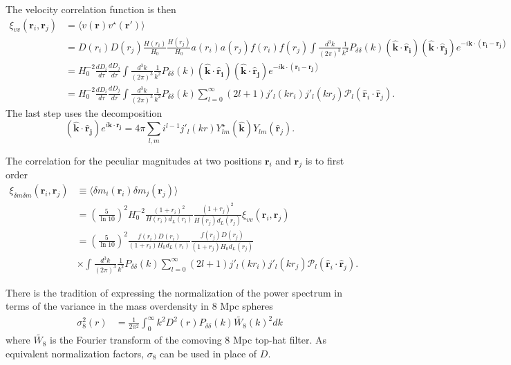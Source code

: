 \documentclass[11pt, oneside]{article}   	%
\begin{document}
The  velocity correlation function is then
\begin{align}
\xi_{v v}(\mathbf{r}_i,\mathbf{r}_j)  & =
\langle v(\mathbf{r})  v^{\star}(\mathbf{r'}) \rangle \\
& = D(r_i) D(r_j)  \frac{H(r_i)}{H_0} \frac{H(r_j)}{H_0} a(r_i) a(r_j) f(r_i) f(r_j)
\int \frac{d^3k}{(2\pi)^3}  \frac{1}{k^2} P_{\delta \delta}(k) 
(\mathbf{\hat{k}} \cdot \mathbf{\hat{r}_i})(\mathbf{\hat{k}} \cdot \mathbf{\hat{r}_j})
e^{-i \mathbf{k}\cdot (\mathbf{r_i}-\mathbf{r_j})} \\
&= H_0^{-2}\frac{dD_i}{d\tau} \frac{dD_j}{d\tau}   \int \frac{d^3k}{(2\pi)^3}  \frac{1}{k^2}  P_{\delta \delta}(k) (\mathbf{\hat{k}} \cdot \mathbf{\hat{r}_i})(\mathbf{\hat{k}} \cdot \mathbf{\hat{r}_j})  e^{-i \mathbf{k}\cdot (\mathbf{r_i}-\mathbf{r_j})}\\
&= H_0^{-2} \frac{dD_i}{d\tau} \frac{dD_j}{d\tau}   \int \frac{d^3k}{(2\pi)^3}  \frac{1}{k^2}  P_{\delta \delta}(k) \sum_{l=0}^{\infty}(2l+1) j'_l(kr_i) j'_l(kr_j)
\mathcal{P}_l(\mathbf{\hat{r}}_i \cdot \mathbf{\hat{r}}_j).
\end{align}
The last step uses the decomposition
\begin{equation}
(\mathbf{\hat{k}} \cdot \mathbf{\hat{r}_j})   e^{i \mathbf{k}\cdot \mathbf{r_j}} = 4\pi \sum_{l,m} i^{l-1}j'_l(kr) Y^{\star}_{lm}(\mathbf{\hat{k}})
Y_{lm}(\mathbf{\hat{r}}_j).
\end{equation}

The correlation for the peculiar magnitudes at two positions
$\mathbf{r}_i$ and $\mathbf{r}_j$ is to first order 
\begin{align}
\xi_{\delta m \delta m}(\mathbf{r}_i,\mathbf{r}_j)  & \equiv  \langle \delta m_i(\mathbf{r}_i) \delta m_j(\mathbf{r}_j) \rangle\\
& =  \left( \frac{5}{\ln{10}}\right)^2  H_0^{-2}\frac{(1+r_i)^2}{H(r_i)d_L(r_i)} \frac{(1+r_j)^2}{H(r_j)d_L(r_j)} \xi_{v v}(\mathbf{r}_i,\mathbf{r}_j)  \\
& =  \left( \frac{5}{\ln{10}}\right)^2 \frac{f(r_i)D(r_i)}{(1+r_i)H_0d_L(r_i)} \frac{f(r_j)D(r_j)}{(1+r_j)H_0d_L(r_j)}  \\
& \times  \int \frac{d^3k}{(2\pi)^3}  \frac{1}{k^2}  P_{\delta \delta}(k) \sum_{l=0}^{\infty}(2l+1) j'_l(kr_i) j'_l(kr_j)
\mathcal{P}_l(\mathbf{\hat{r}}_i \cdot \mathbf{\hat{r}}_j).
\end{align}

There is the tradition of expressing the normalization of the power spectrum in terms of
the variance in the mass overdensity in 8 Mpc spheres 
\begin{align}
\sigma^2_8 (r)& = \frac{1}{2\pi^2} \int_0^\infty  k^2 D^2(r)  P_{\delta \delta}(k) \tilde{W_8}(k)^2 dk
\label{sigma_8:eqn}
\end{align}
where $\tilde{W_8}$ is the Fourier transform of the comoving 8 Mpc top-hat filter.
As equivalent normalization factors, $\sigma_8$ can be used in place of $D$.
\end{document}
